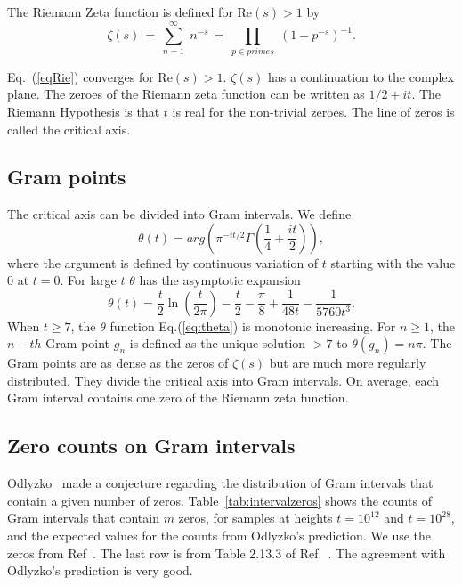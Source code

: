 \documentclass[journal]{IEEEtai}
\begin{document}
The Riemann Zeta function is defined for $\mathrm{Re} (s) > 1$ by
\begin{equation}
\zeta ( s ) \, = \, \sum^{\infty}_{n = 1} \; n^{-s} \, = \, \prod_{p \in primes} \;
\left( 1 - p^{-s} \right)^{-1}.
\label{eqRie}
\end{equation}

Eq.~(\ref{eqRie})  converges for $\mathrm{Re} (s) > 1$.  
 $\zeta ( s )$ has a  continuation
to the complex plane. The zeroes of the Riemann zeta function can be written as $1/2 + i t$. The Riemann Hypothesis  
is that $t$ is real for the non-trivial zeroes. The line of zeros is called the critical axis.

\subsection{Gram points}
The critical axis can be divided into Gram intervals. 
We define
\begin{equation}
\theta(t) = arg (\pi^{-it/2} \Gamma(\frac{1}{4} + \frac{it}{2})), 
\label{eq:theta}
\end{equation}
where the argument is defined by continuous variation of $t$ starting with the value $0$ at $t = 0$.
For large $t$ $\theta$ has the asymptotic expansion
\begin{equation}
\theta(t) = \frac{t}{2}\ln (\frac{t}{2\pi}) - \frac{t}{2} - \frac{\pi}{8} + \frac{1}{48t} - \frac{1}{5760t^3}. 
\label{eq:thetaAsymptotic}
\end{equation}
 When $t \ge 7$, the $\theta$ function Eq.(\ref{eq:theta}) is monotonic increasing. 
For $n \ge 1$, the $n-th$ Gram point $g_n$ is defined as the unique solution $> 7$ to
$\theta (g_n) = n\pi$.
The Gram points are as dense as the zeros of $\zeta(s)$ but are much more regularly distributed. They divide the critical axis into Gram intervals. On average, each Gram interval contains one zero of the Riemann zeta function.

\subsection{Zero counts on Gram intervals}
 Odlyzko~\cite{Odlyzko 1992} made a conjecture regarding the distribution of Gram intervals that contain a given number of zeros. 
Table~\ref{tab:intervalzeros} shows the counts of Gram intervals that contain $m$ zeros, for samples at heights  $t=10^{12}$ and $t=10^{28}$, and the  expected values for the counts from Odlyzko's prediction. We use the zeros from Ref~\cite{hiary 2010}. The last row is from Table 2.13.3 of Ref.~\cite{Odlyzko 1992}. The agreement with Odlyzko's prediction is very good. 
\end{document}
